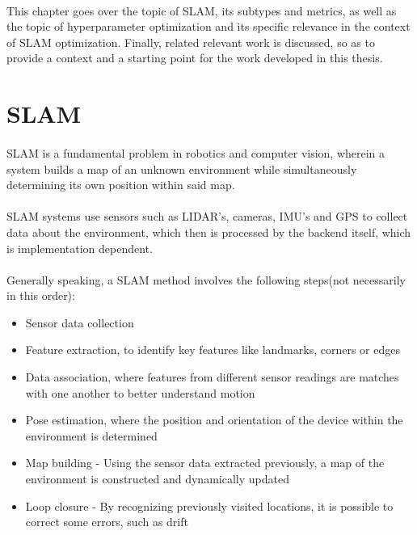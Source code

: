\paragraph{}This chapter goes over the topic of SLAM, its subtypes and metrics, as well as the topic of hyperparameter optimization and its specific relevance in the context of SLAM optimization. Finally, related relevant work is discussed, so as to provide a context and a starting point for the work developed in this thesis.

\section{\ac{SLAM}}

\paragraph{}\ac{SLAM} is a fundamental problem in robotics and computer vision, wherein a system builds a map of an unknown environment while simultaneously determining its own position within said map\citep{taheri2021slam}.
\paragraph{}SLAM systems use sensors such as LIDAR's, cameras, IMU's and GPS to collect data about the environment, which then is processed by the backend itself\cite{taheri2021slam}, which is implementation dependent.
\paragraph{}Generally speaking, a SLAM method involves the following steps(not necessarily in this order):
\begin{itemize}
    \item Sensor data collection
    \item Feature extraction, to identify key features like landmarks, corners or edges
    \item Data association, where features from different sensor readings are matches with one another to better understand motion
    \item Pose estimation, where the position and orientation of the device within the environment is determined
    \item Map building - Using the sensor data extracted previously, a map of the environment is constructed and dynamically updated
    \item Loop closure - By recognizing previously visited locations, it is possible to correct some errors, such as drift
\end{itemize}

